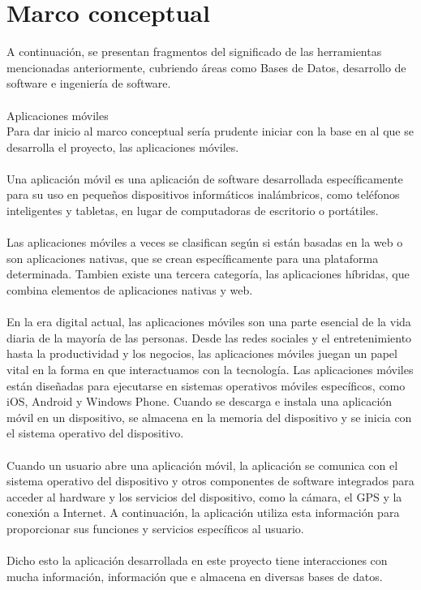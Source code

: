 \documentclass[12pt,onehalfspacing]{report}
\begin{document}
\section{Marco conceptual}
A continuación, se presentan fragmentos del significado de las herramientas mencionadas anteriormente, cubriendo áreas como Bases de Datos, desarrollo de software e ingeniería de software.\\\\
Aplicaciones móviles\\
Para dar inicio al marco conceptual sería prudente iniciar con la base en al que se desarrolla el proyecto, las aplicaciones móviles. \\\\Una aplicación móvil es una aplicación de software desarrollada específicamente para su uso en pequeños dispositivos informáticos inalámbricos, como teléfonos inteligentes y tabletas, en lugar de computadoras de escritorio o portátiles.\\\\Las aplicaciones móviles a veces se clasifican según si están basadas en la web o son aplicaciones nativas, que se crean específicamente para una plataforma determinada. Tambien existe una tercera categoría, las aplicaciones híbridas, que combina elementos de aplicaciones nativas y web.\\\\En la era digital actual, las aplicaciones móviles son una parte esencial de la vida diaria de la mayoría de las personas. Desde las redes sociales y el entretenimiento hasta la productividad y los negocios, las aplicaciones móviles juegan un papel vital en la forma en que interactuamos con la tecnología. 
Las aplicaciones móviles están diseñadas para ejecutarse en sistemas operativos móviles específicos, como iOS, Android y Windows Phone. Cuando se descarga e instala una aplicación móvil en un dispositivo, se almacena en la memoria del dispositivo y se inicia con el sistema operativo del dispositivo.\\\\Cuando un usuario abre una aplicación móvil, la aplicación se comunica con el sistema operativo del dispositivo y otros componentes de software integrados para acceder al hardware y los servicios del dispositivo, como la cámara, el GPS y la conexión a Internet. A continuación, la aplicación utiliza esta información para proporcionar sus funciones y servicios específicos al usuario.\\\\
Dicho esto la aplicación desarrollada en este proyecto tiene interacciones con mucha información, información que e almacena en diversas bases de datos.\\\\
\end{document}
